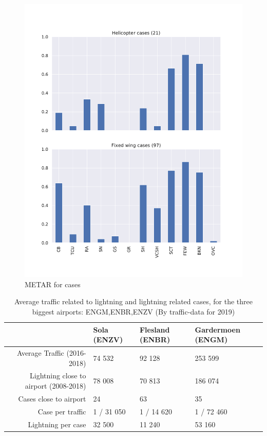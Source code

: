 \begin{figure}
    \centering
    \includegraphics[width=\textwidth]{Figures/METARcases.pdf}
    \caption{METAR for cases}
    \label{fig:metarcases}
\end{figure}

\begin{table}
        \begin{tabular}{r|l|l|l|}
            & Sola (ENZV) & Flesland (ENBR) & Gardermoen (ENGM) \\\hline
            Average Traffic (2016-2018)  & 74 532 & 92 128 & 253 599   \\\hline
            Lightning close to airport (2008-2018) & 78 008 & 70 813   & 186 074 \\\hline
            Cases close to airport & 24 & 63  & 35 \\\hline
            Case per traffic & 1 / 31 050 & 1 / 14 620 & 1 / 72 460\\\hline
            Lightning per case & 32 500 & 11 240 & 53 160 \\\hline
        \end{tabular}
     \caption{Average traffic related to lightning and lightning related cases, for the three biggest airports: ENGM,ENBR,ENZV (By traffic-data for 2019)}
     \label{tab:traffic}
\end{table}

